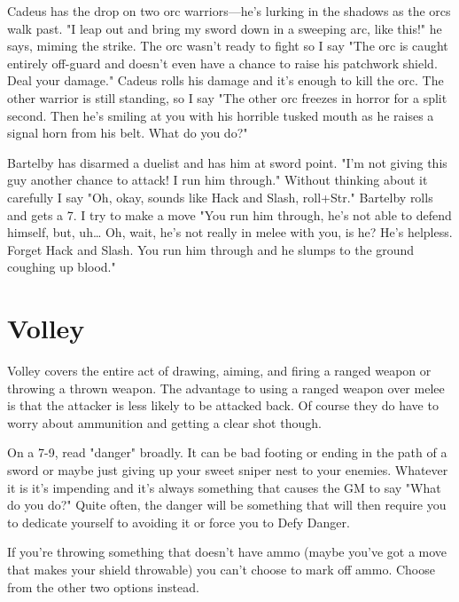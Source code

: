 \startExample
Cadeus has the drop on two orc warriors—he's lurking in the shadows as the orcs walk past. "I leap out and bring my sword down in a sweeping arc, like this!" he says, miming the strike. The orc wasn't ready to fight so I say "The orc is caught entirely off-guard and doesn't even have a chance to raise his patchwork shield. Deal your damage." Cadeus rolls his damage and it's enough to kill the orc. The other warrior is still standing, so I say "The other orc freezes in horror for a split second. Then he's smiling at you with his horrible tusked mouth as he raises a signal horn from his belt. What do you do?"
\stopExample
       
\startExample
Bartelby has disarmed a duelist and has him at sword point. "I'm not giving this guy another chance to attack! I run him through." Without thinking about it carefully I say "Oh, okay, sounds like Hack and Slash, roll+Str." Bartelby rolls and gets a 7. I try to make a move "You run him through, he's not able to defend himself, but, uh… Oh, wait, he's not really in melee with you, is he? He's helpless. Forget Hack and Slash. You run him through and he slumps to the ground coughing up blood."
\stopExample
       
\section{Volley}   
       

Volley covers the entire act of drawing, aiming, and firing a ranged weapon or throwing a thrown weapon. The advantage to using a ranged weapon over melee is that the attacker is less likely to be attacked back. Of course they do have to worry about ammunition and getting a clear shot though.

       

On a 7-9, read "danger" broadly. It can be bad footing or ending in the path of a sword or maybe just giving up your sweet sniper nest to your enemies. Whatever it is it's impending and it's always something that causes the GM to say "What do you do?" Quite often, the danger will be something that will then require you to dedicate yourself to avoiding it or force you to Defy Danger.

       

If you're throwing something that doesn't have ammo (maybe you've got a move that makes your shield throwable) you can't choose to mark off ammo. Choose from the other two options instead.

